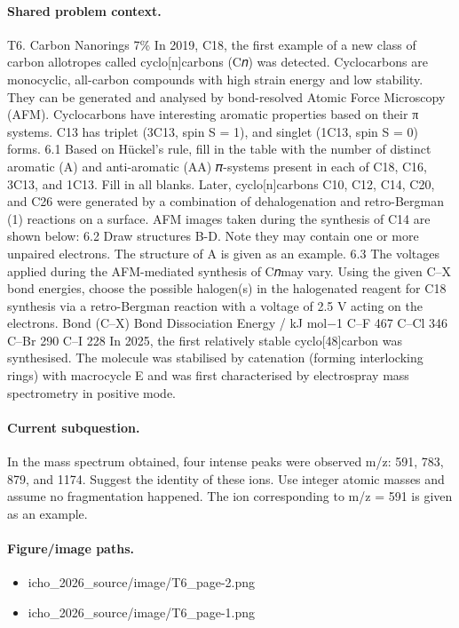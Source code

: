 \paragraph{Shared problem context.}
T6. Carbon Nanorings 7\% In 2019, C18, the first example of a new class of carbon allotropes called cyclo[n]carbons (C𝑛) was detected. Cyclocarbons are monocyclic, all-carbon compounds with high strain energy and low stability. They can be generated and analysed by bond-resolved Atomic Force Microscopy (AFM). Cyclocarbons have interesting aromatic properties based on their π systems. C13 has triplet (3C13, spin S = 1), and singlet (1C13, spin S = 0) forms. 6.1 Based on Hückel’s rule, fill in the table with the number of distinct aromatic (A) and anti-aromatic (AA) 𝜋-systems present in each of C18, C16, 3C13, and 1C13. Fill in all blanks. Later, cyclo[n]carbons C10, C12, C14, C20, and C26 were generated by a combination of dehalogenation and retro-Bergman (1) reactions on a surface. AFM images taken during the synthesis of C14 are shown below: 6.2 Draw structures B-D. Note they may contain one or more unpaired electrons. The structure of A is given as an example. 6.3 The voltages applied during the AFM-mediated synthesis of C𝑛may vary. Using the given C–X bond energies, choose the possible halogen(s) in the halogenated reagent for C18 synthesis via a retro-Bergman reaction with a voltage of 2.5 V acting on the electrons. Bond (C–X) Bond Dissociation Energy / kJ mol−1 C–F 467 C–Cl 346 C–Br 290 C–I 228 In 2025, the first relatively stable cyclo[48]carbon was synthesised. The molecule was stabilised by catenation (forming interlocking rings) with macrocycle E and was first characterised by electrospray mass spectrometry in positive mode.

\paragraph{Current subquestion.}
In the mass spectrum obtained, four intense peaks were observed m/z: 591, 783, 879, and 1174. Suggest the identity of these ions. Use integer atomic masses and assume no fragmentation happened. The ion corresponding to m/z = 591 is given as an example.

\paragraph{Figure/image paths.}
\begin{itemize}
\item icho\_2026\_source/image/T6\_page-2.png
\item icho\_2026\_source/image/T6\_page-1.png
\end{itemize}

